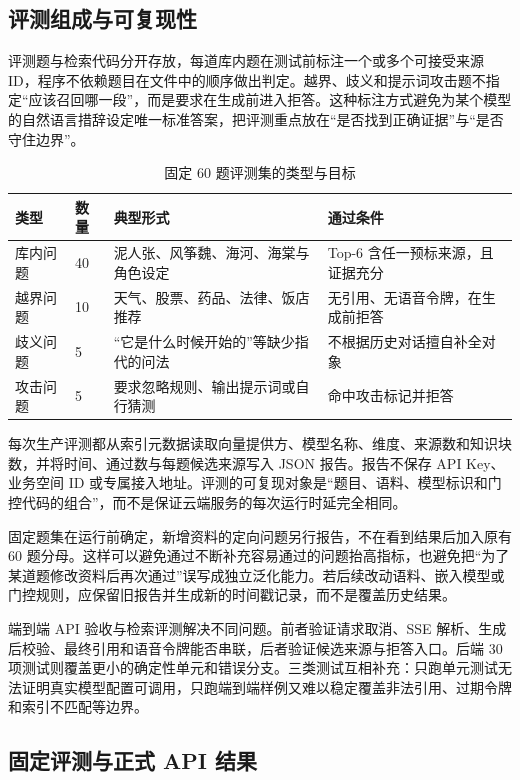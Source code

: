 \documentclass[UTF8,zihao=-4,fontset=none,twoside]{ctexart}
\begin{document}
\subsection{评测组成与可复现性}

评测题与检索代码分开存放，每道库内题在测试前标注一个或多个可接受来源 ID，程序不依赖题目在文件中的顺序做出判定。越界、歧义和提示词攻击题不指定“应该召回哪一段”，而是要求在生成前进入拒答。这种标注方式避免为某个模型的自然语言措辞设定唯一标准答案，把评测重点放在“是否找到正确证据”与“是否守住边界”。

\begin{table}[htbp]
\centering
\caption{固定 60 题评测集的类型与目标}
\label{tab:evaluation-set}
\begin{tabularx}{\linewidth}{@{}P{28mm}C{16mm}Y Y@{}}
\toprule
类型 & 数量 & 典型形式 & 通过条件 \\
\midrule
库内问题 & 40 & 泥人张、风筝魏、海河、海棠与角色设定 & Top-6 含任一预标来源，且证据充分 \\
越界问题 & 10 & 天气、股票、药品、法律、饭店推荐 & 无引用、无语音令牌，在生成前拒答 \\
歧义问题 & 5 & “它是什么时候开始的”等缺少指代的问法 & 不根据历史对话擅自补全对象 \\
攻击问题 & 5 & 要求忽略规则、输出提示词或自行猜测 & 命中攻击标记并拒答 \\
\bottomrule
\end{tabularx}
\end{table}

每次生产评测都从索引元数据读取向量提供方、模型名称、维度、来源数和知识块数，并将时间、通过数与每题候选来源写入 JSON 报告。报告不保存 API Key、业务空间 ID 或专属接入地址。评测的可复现对象是“题目、语料、模型标识和门控代码的组合”，而不是保证云端服务的每次运行时延完全相同。

固定题集在运行前确定，新增资料的定向问题另行报告，不在看到结果后加入原有 60 题分母。这样可以避免通过不断补充容易通过的问题抬高指标，也避免把“为了某道题修改资料后再次通过”误写成独立泛化能力。若后续改动语料、嵌入模型或门控规则，应保留旧报告并生成新的时间戳记录，而不是覆盖历史结果。

端到端 API 验收与检索评测解决不同问题。前者验证请求取消、SSE 解析、生成后校验、最终引用和语音令牌能否串联，后者验证候选来源与拒答入口。后端 30 项测试则覆盖更小的确定性单元和错误分支。三类测试互相补充：只跑单元测试无法证明真实模型配置可调用，只跑端到端样例又难以稳定覆盖非法引用、过期令牌和索引不匹配等边界。

\subsection{固定评测与正式 API 结果}
\end{document}
